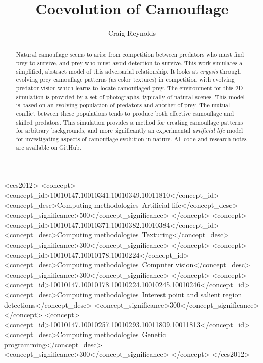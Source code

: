 \documentclass[acmtog]{acmart}
\begin{document}
\title{Coevolution of Camouflage}

\author{Craig Reynolds}

\renewcommand{\shortauthors}{Craig Reynolds}


\begin{abstract}
  Natural camouflage seems to arise from competition between predators who must find prey to survive, and prey who must avoid detection to survive. This work simulates a simplified, abstract model of this adversarial relationship. It looks at \textit{crypsis} through evolving prey camouflage patterns (as color textures) in competition with evolving predator vision which learns to locate camouflaged prey. The environment for this 2D simulation is provided by a set of photographs, typically of natural scenes. This model is based on an evolving population of predators and another of prey. The mutual conflict between these populations tends to produce both effective camouflage and skilled predators. This simulation provides a method for creating camouflage patterns for arbitrary backgrounds, and more significantly an experimental \textit{artificial life} model for investigating aspects of camouflage evolution in nature. All code and research notes are available on GitHub.
\end{abstract}


\begin{CCSXML}
<ccs2012>
   <concept>
       <concept_id>10010147.10010341.10010349.10011810</concept_id>
       <concept_desc>Computing methodologies~Artificial life</concept_desc>
       <concept_significance>500</concept_significance>
       </concept>
   <concept>
       <concept_id>10010147.10010371.10010382.10010384</concept_id>
       <concept_desc>Computing methodologies~Texturing</concept_desc>
       <concept_significance>300</concept_significance>
       </concept>
   <concept>
       <concept_id>10010147.10010178.10010224</concept_id>
       <concept_desc>Computing methodologies~Computer vision</concept_desc>
       <concept_significance>300</concept_significance>
       </concept>
    <concept>
       <concept_id>10010147.10010178.10010224.10010245.10010246</concept_id>
       <concept_desc>Computing methodologies~Interest point and salient region detections</concept_desc>
       <concept_significance>300</concept_significance>
       </concept>
    <concept>
        <concept_id>10010147.10010257.10010293.10011809.10011813</concept_id>
        <concept_desc>Computing methodologies~Genetic programming</concept_desc>
        <concept_significance>300</concept_significance>
    </concept>
 </ccs2012>
\end{CCSXML}
\end{document}
